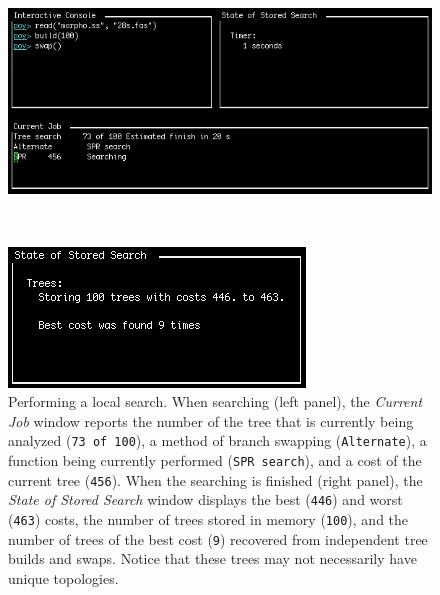 {\begin{figure}
\centering
\begin{minipage}[c]{0.49\textwidth}
\includegraphics[width=\textwidth]{doc/figures/swap1.jpg}
\end{minipage}
\,
\begin{minipage}[c]{0.453\textwidth}
\includegraphics[width=\textwidth]{doc/figures/swap2.jpg}
\end{minipage}
\caption{Performing a local search. When searching (left panel),
the \emph{Current Job} window reports the number of the tree that
is currently being analyzed (\texttt{73 of 100}), a method of branch
swapping (\texttt{Alternate}), a function being currently performed
(\texttt{SPR search}), and a cost of the current tree (\texttt{456}).
When the searching is finished (right panel), the \emph{State of
Stored Search} window displays the best (\texttt{446}) and worst
(\texttt{463}) costs, the number of trees stored in memory
(\texttt{100}), and the number of trees of the best cost (\texttt{9})
recovered from independent tree builds and swaps. Notice that these trees may
not necessarily have unique topologies.}
\label{fig:swapping}
\end{figure}

}
